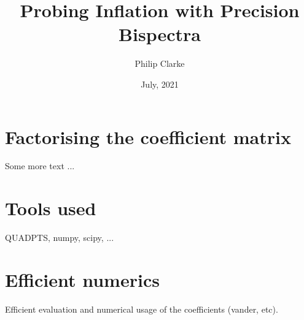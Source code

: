 \documentclass[withindex,glossary]{cam-thesis}
\title{Probing Inflation with Precision Bispectra}
\author{Philip Clarke}
\date{July, 2021}
\begin{document}
\frontmatter{}










%



%

\renewcommand{\bibname}{References}
\cleardoublepage
{}
{}






\appendix

\chapter{Factorising the coefficient matrix}
Some more text ...

\chapter{Tools used}
QUADPTS, numpy, scipy, ...

\chapter{Efficient numerics}
Efficient evaluation and numerical usage of the coefficients (vander, etc).


\printthesisindex
\end{document}
